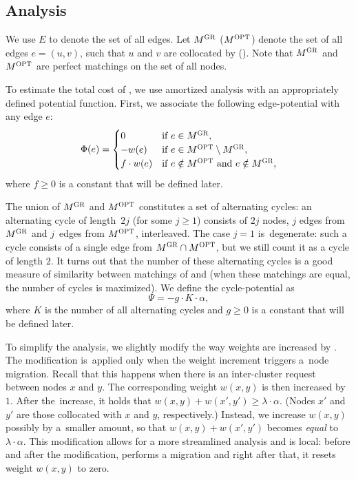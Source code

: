 \subsection{Analysis}

We use $E$ to denote the set of all edges.
Let $M^\textsc{GR}$ ($M^\textsc{OPT}$) denote the set of all edges $e = (u,v)$, such 
that $u$ and $v$ are collocated by \GREEDY (\OPT). 
Note that $M^\textsc{GR}$ and $M^\textsc{OPT}$ are perfect matchings on the set of all nodes.

To estimate the total cost of \GREEDY, we use amortized analysis with 
an appropriately defined potential function. First, 
we associate the following edge-potential with any edge $e$:
\[
	\Phi(e) = \begin{cases}
		0 			& \textrm{if $e \in M^\textsc{GR}$,} \\
		- w(e) 	& \textrm{if $e \in M^\textsc{OPT} \setminus M^\textsc{GR}$,} \\
		f \cdot w(e) & \textrm{if $e \notin M^\textsc{OPT}$ and $e \notin M^\textsc{GR}$,} \\
	\end{cases}
\]
where $f \geq 0$ is a constant that will be defined later. 

The union of $M^\textsc{GR}$ and $M^\textsc{OPT}$ constitutes a set of alternating cycles:
an alternating cycle of length~$2 j$ (for some $j \geq 1$) consists of $2 j$
nodes, $j$ edges from $M^\textsc{GR}$ and $j$~edges from $M^\textsc{OPT}$, interleaved. The
case $j = 1$ is~degenerate: such a cycle consists of a single edge from $M^\textsc{GR}
\cap M^\textsc{OPT}$, but we still count it as a cycle of length $2$. 
It turns out that the number of these alternating cycles is a good measure of 
similarity between matchings of \GREEDY and \OPT (when these matchings are 
equal, the number of cycles is maximized). We define the
cycle-potential as
\[
	\Psi = - g \cdot K \cdot \alpha,
\]
where $K$ is the number of all alternating cycles and $g \geq 0$ is a constant that will
be defined later.

To simplify the analysis, we slightly modify the way weights are increased by
\GREEDY. The modification is~applied only when the weight increment triggers 
a~node migration. Recall that this happens when there is an inter-cluster
request between nodes $x$ and $y$. The corresponding weight $w(x,y)$ is then
increased by $1$. After the~increase, it holds that $w(x,y) + w(x',y') \geq
\lambda \cdot \alpha$. (Nodes $x'$ and $y'$ are those collocated with $x$ and $y$,
respectively.) Instead, we increase $w(x,y)$ possibly by a~smaller amount, so
that $w(x,y) + w(x',y')$ becomes \emph{equal} to $\lambda \cdot \alpha$. This
modification allows for a more streamlined analysis and is local: before and
after the modification, \GREEDY performs a migration and right after that, 
it resets weight $w(x,y)$ to zero.

